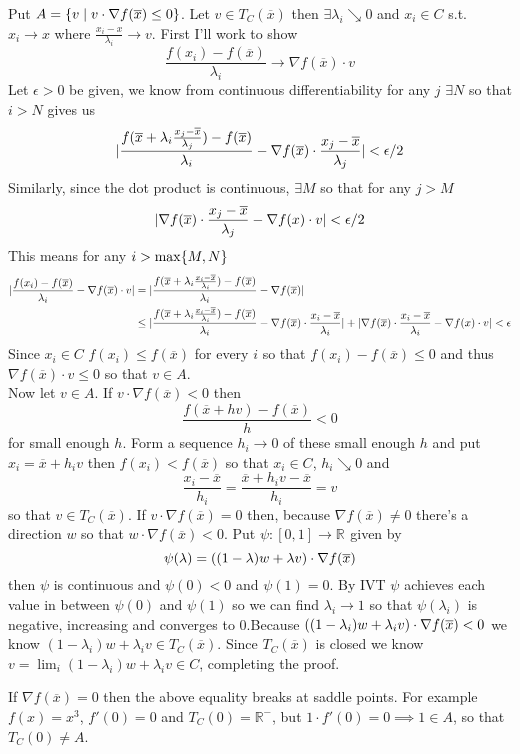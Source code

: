 \documentclass{article}
\newenvironment{ex}[1]
  {\renewcommand\theexercise{#1}\exercise}
  {\endexercise}
\newcommand{\R}[1]{\mathbb{R}^{#1}}
\newcommand{\xb}{\overline{x}}
\begin{document}
\begin{ex}{10.16} %
  Put $A = \braces{ v \mid v \cdot \nabla f(\xb) \le 0 }$. Let $v \in T_C(\xb)$ then $\exists \lambda_i \searrow 0$ and $x_i \in C$ s.t. $x_i \to x$ where $\frac{x_i - x}{\lambda_i} \to v$. First I'll work to show
  $$
  \frac{f(x_i) - f(\xb)}{\lambda_i} \to \nabla f(\xb) \cdot v
  $$
  Let $\epsilon > 0$ be given, we know from continuous differentiability for any $j$ $\exists N$ so that $i > N$ gives us
  $$
  \abs{\frac{f\parens{\xb + \lambda_i \frac{x_j - \xb}{\lambda_j}} - f(\xb)}{\lambda_i} - \nabla f(\xb) \cdot \frac{x_j - \xb}{\lambda_j}} < \epsilon / 2
  $$
  Similarly, since the dot product is continuous, $\exists M$ so that for any $j > M$
  $$
  \abs{\nabla f(\xb) \cdot \frac{x_j - \xb}{\lambda_j} - \nabla f(x) \cdot v} < \epsilon / 2
  $$
  This means for any $i > \max\{M,N\}$
  \begin{align*}
    \abs{\frac{f(x_i) - f(\xb)}{\lambda_i} - \nabla f(\xb) \cdot v} &= \abs{\frac{f\parens{\xb + \lambda_i \frac{x_i - \xb}{\lambda_i}} - f(\xb)}{\lambda_i} - \nabla f(\xb)} \\
    &\le \abs{\frac{f\parens{\xb + \lambda_i \frac{x_i - \xb}{\lambda_i}} - f(\xb)}{\lambda_i} - \nabla f(\xb) \cdot \frac{x_i - \xb}{\lambda_i}} + \abs{\nabla f(\xb) \cdot \frac{x_i - \xb}{\lambda_i} - \nabla f(x) \cdot v} < \epsilon
  \end{align*}
  Since $x_i \in C$ $f(x_i) \le f(\xb)$ for every $i$ so that $f(x_i) - f(\xb) \le 0$ and thus $\nabla f(\xb) \cdot v \le 0$ so that $v \in A$. \, \\

  Now let $v \in A$. If $v \cdot \nabla f(\xb) < 0$ then
  $$
  \frac{f(\xb + h v) - f(\xb)}{h} < 0
  $$
  for small enough $h$. Form a sequence $h_i \to 0$ of these small enough $h$ and put $x_i = \xb + h_i v$ then $f(x_i) < f(\xb)$ so that $x_i \in C$, $h_i \searrow 0$ and
  $$
  \frac{x_i - \xb}{h_i} = \frac{\xb + h_i v - \xb}{h_i} = v
  $$
  so that $v \in T_C(\xb)$. If $v \cdot \nabla f(\xb) = 0$ then, because $\nabla f(\xb) \ne 0$ there's a direction $w$ so that $w \cdot \nabla f(\xb) < 0$. Put $\psi : [0, 1] \to \R{}$ given by
  $$
  \psi(\lambda) = \parens{ (1-\lambda)w + \lambda v } \cdot \nabla f(\xb)
  $$
  then $\psi$ is continuous and $\psi(0) < 0$ and $\psi(1) = 0$. By IVT $\psi$ achieves each value in between $\psi(0)$ and $\psi(1)$ so we can find $\lambda_i \to 1$ so that $\psi(\lambda_i)$ is negative, increasing and converges to $0$.Because $\parens{ (1-\lambda_i)w + \lambda_i v } \cdot \nabla f(\xb) < 0$ we know $(1-\lambda_i)w + \lambda_i v \in T_C(\xb)$. Since $T_C(\xb)$ is closed we know $v = \lim_i (1-\lambda_i)w + \lambda_i v \in C$, completing the proof. \, \\
  \pagehline

  If $\nabla f(\xb) = 0$ then the above equality breaks at saddle points. For example $f(x) = x^3$, $f'(0) = 0$ and $T_C(0) = \R{-}$, but $1 \cdot f'(0) = 0 \implies 1 \in A$, so that $T_C(0) \ne A$.
\end{ex} %
\end{document}
